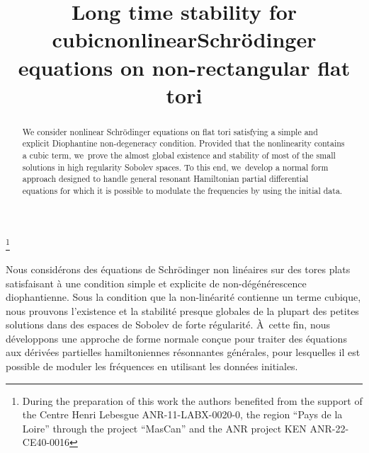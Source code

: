 \documentclass[JEP,XML,SOM,Unicode,published]{cedram}
\theoremstyle{plain}
\theoremstyle{definition}
\newcommand{\1}{\mathbf{1}}
\begin{document}
\frontmatter

\title[Stability for NLS on flat tori]{Long time stability for cubic\nobreakspace nonlinear\nobreakspace Schrödinger equations on non-rectangular flat tori}

\author[\initial{J.} \lastname{Bernier}]{ }
\address{Nantes Université, CNRS, Laboratoire de Mathématiques Jean Leray, LMJL,\\
F-44000 Nantes, France}

\author[\initial{N.} \lastname{Camps}]{ }
\address{Univ Rennes, CNRS, IRMAR - UMR 6625,\\
F-35000 Rennes, France}

\thanks{During the preparation of this work the authors benefited from the support of the Centre Henri Lebesgue ANR-11-LABX-0020-0, the region ``Pays de la Loire'' through the project ``MasCan'' and the ANR project KEN ANR-22-CE40-0016}

\begin{abstract}
We consider nonlinear Schrödinger equations on flat tori satisfying a simple and explicit Diophantine non-degeneracy condition. Provided that the nonlinearity contains a cubic term, we~prove the almost global existence and stability of most of the small solutions in high regularity Sobolev spaces. To this end, we~develop a normal form approach designed to handle general resonant Hamiltonian partial differential equations for which it is possible to modulate the frequencies by using the initial data.
\end{abstract}





\begin{altabstract}
Nous considérons des équations de Schrödinger non linéaires sur des tores plats satisfaisant à une condition simple et explicite de non-dégénérescence diophantienne. Sous la condition que la non-linéarité contienne un terme cubique, nous prouvons l’existence et la stabilité presque globales de la plupart des petites solutions dans des espaces de Sobolev de forte régularité. À~cette fin, nous développons une approche de forme normale conçue pour traiter des équations aux dérivées partielles hamiltoniennes résonnantes générales, pour lesquelles il est possible de moduler les fréquences en utilisant les données initiales.
\end{altabstract}
\end{document}
